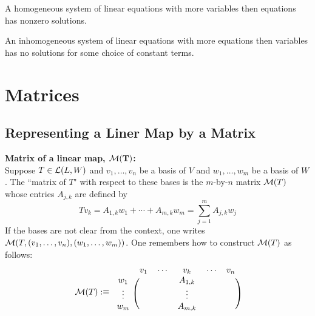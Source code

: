 \setcounter{thm}{25}
\begin{thm}
    A homogeneous system of linear equations with more variables then equations has nonzero solutions.
\end{thm}

\setcounter{thm}{27}
\begin{thm}
	An inhomogeneous system of linear equations with more equations then variables has no solutions for some choice of constant terms.
\end{thm}

\pagebreak

\section{Matrices}
\subsection{Representing a Liner Map by a Matrix}

\setcounter{thm}{30}
\begin{mydef}
    \label{matrix-of-linear-map}
    \textbf{Matrix of a linear map, $\mathbf{\mathcal{M}(T)}$:} \\
    Suppose $T \in \mathcal{L} (L,W)$ and $v_1, \dots, v_n$ be a basis of $V$ and $w_1, \dots, w_m$ be a basis of $W$. The ``matrix of $T$" with respect to these bases is the $m$-by-$n$ matrix $\mathcal{M}(T)$ whose entries $A_{j,k}$ are defined by 
    \begin{equation}
        T v_k = A_{1,k} w_1 + \cdots + A_{m,k} w_m = \sum_{j=1}^{m} A_{j,k} w_j
    \end{equation}
    If the bases are not clear from the context, one writes $\mathcal{M}(T, (v_1, \dots, v_n),(w_1, \dots, w_m))$. One remembers how to construct $\mathcal{M}(T)$ as follows:
    \begin{equation}
        \mathcal{M} (T) :\equiv 
        \begin{blockarray}{cccc}
            & v_1 \quad \cdots & v_k & \cdots \quad v_n \\
            \begin{block}{c(ccc)}
                w_1    & & A_{1,k} & \\
                \vdots & & \vdots & \\
                w_m    & & A_{m,k} & \\
            \end{block}
        \end{blockarray}
    \end{equation}
\end{mydef}

